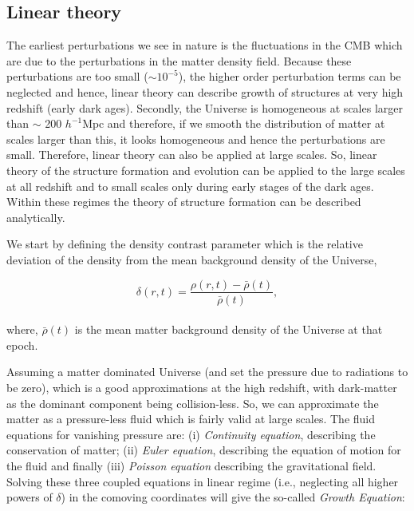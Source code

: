 \subsection{Linear theory}

The earliest perturbations we see in nature is the fluctuations in the
CMB which are due to the perturbations in the matter density
field. Because these perturbations are too small ($\sim 10^{-5}$), 
the higher order perturbation
terms can be neglected and hence, linear theory can describe growth of structures
at very high redshift (early dark ages). 
Secondly, the Universe is homogeneous at scales larger than
$\sim$ 200 $h^{-1} \mathrm{Mpc}$ and therefore, if we smooth the distribution
of matter at scales larger than this, it looks homogeneous and hence the perturbations
are small. Therefore, linear theory can also be applied at large scales. 
So, linear theory of the structure formation and evolution can be applied
to the large scales at all redshift and to small scales only during
early stages of the dark ages. 
Within these regimes the theory of structure formation can be
described analytically.

We start by defining the density contrast parameter which is the relative 
deviation of the density from the mean background density of the Universe,

\begin{equation}
	\delta(r,t) = \dfrac{\rho(r,t) - \bar{\rho}(t)}{\bar{\rho}(t)},
\end{equation}
\\
where, $\bar{\rho}(t)$ is the mean matter background density 
of the Universe at that epoch. 

Assuming a matter dominated Universe (and set the pressure due to radiations
to be zero), which is a good approximations at the
high redshift, with dark-matter as the dominant component being collision-less. 
So, we can approximate the matter as a pressure-less fluid which is fairly 
valid at large scales. The fluid equations for vanishing pressure are: 
(i) {\it Continuity equation}, describing the conservation of matter; (ii) {\it Euler
equation}, describing the equation of motion for the fluid and finally (iii) 
{\it Poisson equation} describing the gravitational field. Solving these three coupled
equations in linear regime (i.e., neglecting all higher powers of $\delta$) in 
the comoving coordinates will give
the so-called {\it Growth Equation}:

